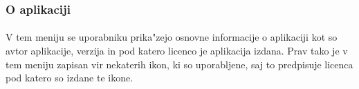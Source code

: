 \subsubsection{O aplikaciji}
\paragraph{}V tem meniju se uporabniku prika"zejo osnovne informacije o aplikaciji kot so avtor aplikacije, verzija in pod katero licenco je aplikacija izdana. Prav tako je v tem meniju zapisan vir nekaterih ikon, ki so uporabljene, saj to predpisuje licenca pod katero so izdane te ikone.
